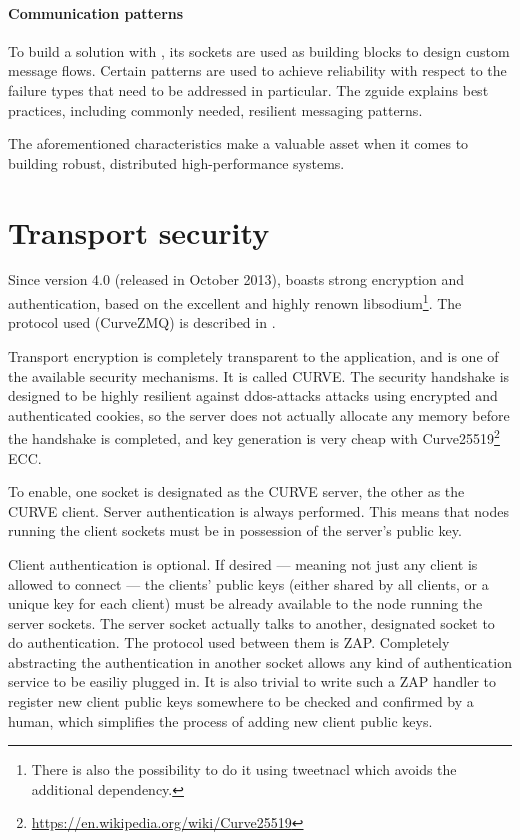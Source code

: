 \paragraph{Communication patterns} To build a solution with \zmq, its sockets are used as building blocks to
design custom message flows. Certain patterns are used to achieve reliability
with respect to the failure types that need to be addressed in particular.  The
\gls{zguide} explains best practices, including commonly needed, resilient
messaging patterns.

The aforementioned characteristics make \zmq a valuable asset when it comes to building
robust, distributed high-performance systems.

\section{Transport security}\label{sec:zmq:security}
Since version 4.0 (released in October 2013), \zmq boasts strong encryption and
authentication, based on the excellent and highly renown
\gls{libsodium}\footnote{There is also the possibility to do it using
\gls{tweetnacl} which avoids the additional dependency.}. The protocol used
(CurveZMQ) is described in \cite{zmq:curvezmq}.

Transport encryption is completely transparent to the application, and is one
of the available security mechanisms. It is called CURVE. The
security handshake is designed to be highly resilient against
\glspl{ddos-attack} attacks using encrypted and authenticated cookies, so the
server does not actually allocate any memory before the handshake is completed,
and key generation is very cheap \cite[p.~2]{djb:ed25519} with
Curve25519\footnote{\url{https://en.wikipedia.org/wiki/Curve25519}} \gls{ECC}.

To enable, one socket is designated as the CURVE server, the other as the CURVE client.
Server authentication is always performed. This means that nodes running the
client sockets must be in possession of the server's public key.

Client authentication is optional. If desired --- meaning not just any client
is allowed to connect --- the clients' public keys (either shared by all
clients, or a unique key for each client) must be already available to the node
running the server sockets. The server socket actually talks to another,
designated socket to do authentication. The protocol used between them is
\gls{ZAP}. Completely abstracting the authentication in another socket allows
any kind of authentication service to be easiliy plugged in. It is also trivial
to write such a ZAP handler to register new client public keys somewhere to be
checked and confirmed by a human, which simplifies the process of adding new
client public keys.


